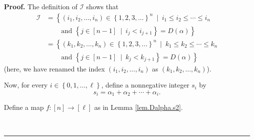 \documentclass[numbers=enddot,12pt,final,onecolumn,notitlepage,abstracton]{scrartcl}
\theoremstyle{definition}
\newenvironment{proof}[1][Proof]{\noindent\textbf{#1.} }{\ \rule{0.5em}{0.5em}}
\newenvironment{verlong}{}{}
\begin{document}
\begin{verlong}
\begin{footnotesize}
\begin{proof}
The definition of $\mathcal{I}$ shows that%
\begin{align*}
\mathcal{I}  &  =\left\{  \left(  i_{1},i_{2},\ldots,i_{n}\right)  \in\left\{
1,2,3,\ldots\right\}  ^{n}\ \mid\ i_{1}\leq i_{2}\leq\cdots\leq i_{n}\right.
\\
&  \ \ \ \ \ \ \ \ \ \ \left.  \text{and }\left\{  j\in\left[  n-1\right]
\ \mid\ i_{j}<i_{j+1}\right\}  =D\left(  \alpha\right)  \right\} \\
&  =\left\{  \left(  k_{1},k_{2},\ldots,k_{n}\right)  \in\left\{
1,2,3,\ldots\right\}  ^{n}\ \mid\ k_{1}\leq k_{2}\leq\cdots\leq k_{n}\right.
\\
&  \ \ \ \ \ \ \ \ \ \ \left.  \text{and }\left\{  j\in\left[  n-1\right]
\ \mid\ k_{j}<k_{j+1}\right\}  =D\left(  \alpha\right)  \right\}
\end{align*}
(here, we have renamed the index $\left(  i_{1},i_{2},\ldots,i_{n}\right)  $
as $\left(  k_{1},k_{2},\ldots,k_{n}\right)  $).

Now, for every $i\in\left\{  0,1,\ldots,\ell\right\}  $, define a nonnegative
integer $s_{i}$ by
\[
s_{i}=\alpha_{1}+\alpha_{2}+\cdots+\alpha_{i}.
\]


Define a map $f:\left[  n\right]  \rightarrow\left[  \ell\right]  $ as in
Lemma \ref{lem.Dalpha.s2}.


\end{proof}
\end{footnotesize}
\end{verlong}
\end{document}
